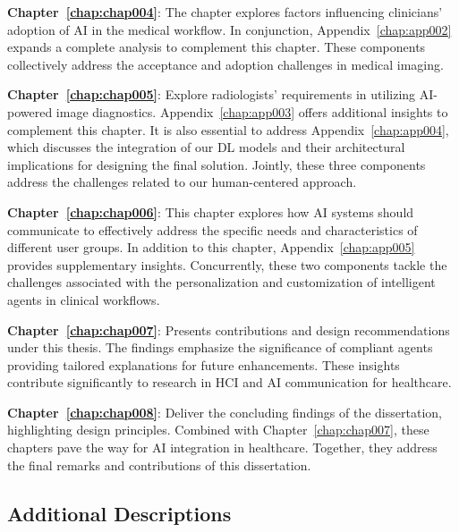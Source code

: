 \vspace{2.00mm}

\noindent
{\bf Chapter~\ref{chap:chap004}}:
The chapter explores factors influencing clinicians' adoption of \ac{AI} in the medical workflow.
In conjunction, Appendix~\ref{chap:app002} expands a complete analysis to complement this chapter.
These components collectively address the acceptance and adoption challenges in medical imaging.

\vspace{2.00mm}

\noindent
{\bf Chapter~\ref{chap:chap005}}:
Explore radiologists' requirements in utilizing \ac{AI}-powered image diagnostics.
Appendix~\ref{chap:app003} offers additional insights to complement this chapter.
It is also essential to address Appendix~\ref{chap:app004}, which discusses the integration of our \ac{DL} models and their architectural implications for designing the final solution.
Jointly, these three components address the challenges related to our human-centered approach.

\vspace{2.00mm}

\noindent
{\bf Chapter~\ref{chap:chap006}}: This chapter explores how \ac{AI} systems should communicate to effectively address the specific needs and characteristics of different user groups.
In addition to this chapter, Appendix~\ref{chap:app005} provides supplementary insights.
Concurrently, these two components tackle the challenges associated with the personalization and customization of intelligent agents in clinical workflows.

\noindent
{\bf Chapter~\ref{chap:chap007}}:
Presents contributions and design recommendations under this thesis.
The findings emphasize the significance of compliant agents providing tailored explanations for future enhancements.
These insights contribute significantly to research in \ac{HCI} and \ac{AI} communication for healthcare.

\vspace{2.00mm}

\noindent
{\bf Chapter~\ref{chap:chap008}}:
Deliver the concluding findings of the dissertation, highlighting design principles.
Combined with Chapter~\ref{chap:chap007}, these chapters pave the way for \ac{AI} integration in healthcare.
Together, they address the final remarks and contributions of this dissertation.


\subsection{Additional Descriptions}
\label{sec:chap001004002}

